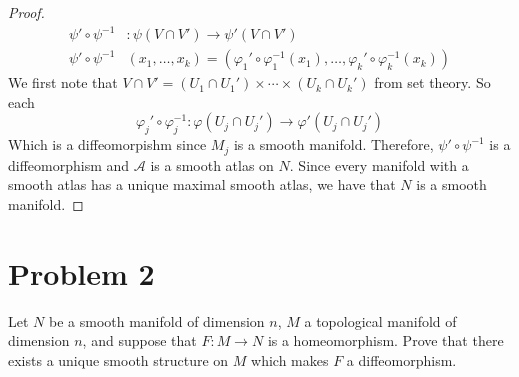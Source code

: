 \documentclass[a4paper]{article}
\begin{document}
\begin{proof}
  \[
    \begin{aligned}
      \psi' \circ \psi^{-1}&: \psi(V \cap V') \rightarrow \psi'(V \cap V') \\
      \psi' \circ \psi^{-1}&(x_1, \dots, x_k) = (\varphi_1' \circ \varphi_1^{-1}(x_1), \dots, \varphi_k' \circ \varphi_k^{-1}(x_k))
    \end{aligned}
  \]
  We first note that $V \cap V' = (U_1 \cap U_1') \times \cdots \times (U_k \cap U_k')$ from set theory. So each 
\[
  \varphi_j' \circ \varphi_j^{-1}: \varphi(U_j \cap U_j') \rightarrow \varphi'(U_j \cap U_j')
\]
Which is a diffeomorpishm since $M_j$ is a smooth manifold. Therefore, $\psi' \circ \psi^{-1}$ is a diffeomorphism and $\mathcal{A}$ is a smooth atlas on $N$. Since every manifold with a smooth atlas has a unique maximal smooth atlas, we have that $N$ is a smooth manifold.
\end{proof}

\section*{Problem 2}%
\label{sec:Problem 2}
Let $N$ be a smooth manifold of dimension $n$, $M$ a topological manifold of dimension $n$, and suppose that $F: M \rightarrow N$ is a homeomorphism. Prove that there exists a unique smooth structure on $M$ which makes $F$ a diffeomorphism.
\end{document}
